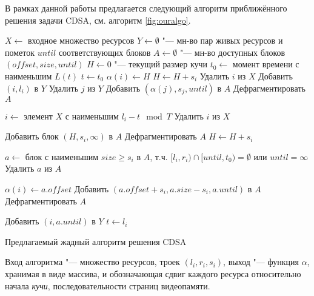 В рамках данной работы предлагается следующий алгоритм приближённого решения задачи CDSA, см. алгоритм \ref{fig:ouralgo}.
\begin{algorithm}
\small
\begin{algorithmic}[1]
\State $X \gets$ входное множество ресурсов
\State $Y \gets \emptyset$ "--- мн-во пар живых ресурсов и пометок $until$ соответствующих блоков
\State $A \gets \emptyset$ "--- мн-во доступных блоков $(offset, size, until)$
\State $H \gets 0$ "--- текущий размер кучи
\State $t_0 \gets$ момент времени с наименьшим $L(t)$ 
\State $t \gets t_0$
 
    \State $\alpha(i) \gets H$
    \State $H \gets H + s_i$
    \State Удалить $i$ из $X$
    \State Добавить $(i, l_i)$ в $Y$
\EndFor {}
\Repeat {}
     
            \State Удалить $j$ из $Y$
            \State Добавить $(\alpha(j), s_j, until)$ в $A$
            \State Дефрагментировать $A$
        \EndIf
    \EndFor {}

    \State $i \gets$ элемент $X$ с наименьшим $l_i - t \mod T$ 
    \State Удалить $i$ из $X$

     
        \State Добавить блок $(H, s_i, \infty)$ в $A$
        \State Дефрагментировать $A$
        \State $H \gets H + s_i$
    \EndIf {}

    \State $a \gets$ блок с наименьшим $size \geqslant s_i$ в $A$, т.ч. $[l_i, r_i) \cap [until, t_0) = \emptyset$ или $until = \infty$ 
    \State Удалить $a$ из $A$

    \State $\alpha(i) \gets a.offset$
        \State Добавить $(a.offset + s_i, a.size - s_i, a.until)$ в $A$
        \State Дефрагментировать $A$
    \EndIf

    \State Добавить $\left(i, a.until\right)$ в $Y$
    \State $t \gets l_i$
 
\end{algorithmic}
\caption{Предлагаемый жадный алгоритм решения CDSA}
\label{fig:ouralgo}
\end{algorithm}
Вход алгоритма "--- множество ресурсов, троек $(l_i, r_i, s_i)$, выход "--- функция $\alpha$, хранимая в виде массива, и обозначающая сдвиг каждого ресурса относительно начала \textit{кучи}, последовательности страниц видеопамяти.
